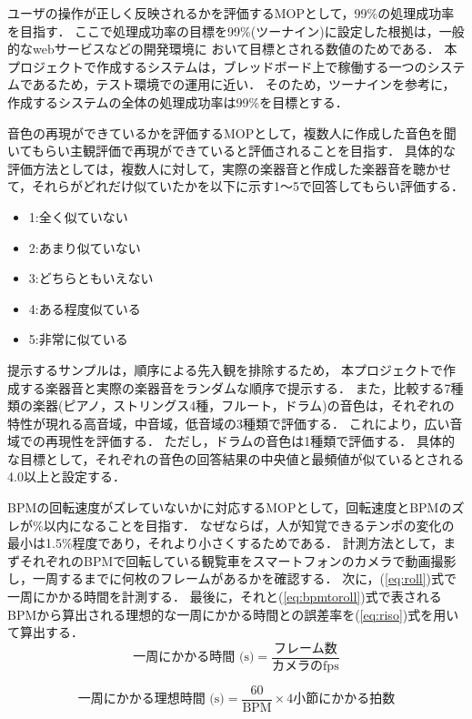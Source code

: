 \documentclass[lualatex,book,paper=a4paper,jafontsize=11.5pt,jafontscale=1.05]{jlreq}
\begin{document}
ユーザの操作が正しく反映されるかを評価するMOPとして，99\%の処理成功率を目指す．
ここで処理成功率の目標を99\%(ツーナイン)に設定した根拠は，一般的なwebサービスなどの開発環境に
おいて目標とされる数値のためである\cite{bib:twonine}．
本プロジェクトで作成するシステムは，ブレッドボード上で稼働する一つのシステムであるため，テスト環境での運用に近い．
そのため，ツーナインを参考に，作成するシステムの全体の処理成功率は99\%を目標とする．

音色の再現ができているかを評価するMOPとして，複数人に作成した音色を聞いてもらい主観評価で再現ができていると評価されることを目指す．
具体的な評価方法としては，複数人に対して，実際の楽器音と作成した楽器音を聴かせて，それらがどれだけ似ていたかを以下に示す1〜5で回答してもらい評価する．
\begin{itemize}
	\item 1:全く似ていない
	\item 2:あまり似ていない
	\item 3:どちらともいえない
	\item 4:ある程度似ている
	\item 5:非常に似ている
\end{itemize}
提示するサンプルは，順序による先入観を排除するため，
本プロジェクトで作成する楽器音と実際の楽器音をランダムな順序で提示する．
また，比較する7種類の楽器(ピアノ，ストリングス4種，フルート，ドラム)の音色は，それぞれの特性が現れる高音域，中音域，低音域の3種類で評価する．
これにより，広い音域での再現性を評価する．
ただし，ドラムの音色は1種類で評価する．
具体的な目標として，それぞれの音色の回答結果の中央値と最頻値が似ているとされる4.0以上と設定する．

BPMの回転速度がズレていないかに対応するMOPとして，回転速度とBPMのズレが\%以内になることを目指す．
なぜならば，人が知覚できるテンポの変化の最小は1.5\%程度であり，それより小さくするためである\cite{bib:tempo}．
計測方法として，まずそれぞれのBPMで回転している観覧車をスマートフォンのカメラで動画撮影し，一周するまでに何枚のフレームがあるかを確認する．
次に，(\ref{eq:roll})式で一周にかかる時間を計測する．
最後に，それと(\ref{eq:bpmtoroll})式で表されるBPMから算出される理想的な一周にかかる時間との誤差率を(\ref{eq:riso})式を用いて算出する．
\begin{equation}
	\mbox{一周にかかる時間 (s)} = \frac{\mbox{フレーム数}}{\mbox{カメラのfps}}
        \label{eq:roll}
\end{equation}

\begin{equation}
	\mbox{一周にかかる理想時間 (s)} = \frac{60}{\mbox{BPM}} \times \mbox{4小節にかかる拍数}
	\label{eq:bpmtoroll}
\end{equation}
\end{document}
